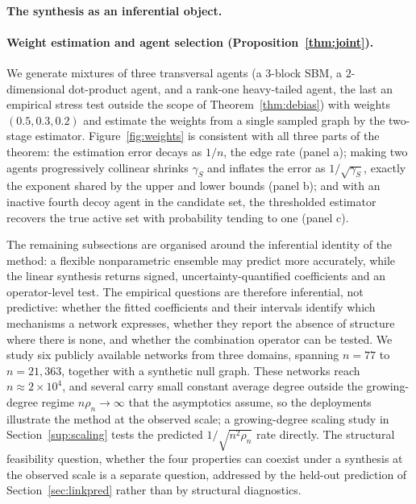 \documentclass[12pt]{article}
\newcommand{\1}{\mathbf{1}}
\begin{document}
\paragraph{The synthesis as an inferential object.}

\paragraph{Weight estimation and agent selection (Proposition~\ref{thm:joint}).}
We generate mixtures of three transversal agents (a $3$-block SBM, a $2$-dimensional dot-product
agent, and a rank-one heavy-tailed agent, the last an empirical stress test outside the scope of
Theorem~\ref{thm:debias}) with weights $(0.5,0.3,0.2)$ and estimate the weights from
a single sampled graph by the two-stage estimator. Figure~\ref{fig:weights} is consistent with all three parts
of the theorem: the estimation error decays as $1/n$, the edge rate (panel a); making two
agents progressively collinear shrinks $\gamma_S$ and inflates the error as $1/\sqrt{\gamma_S}$,
exactly the exponent shared by the upper and lower bounds (panel b); and with an inactive fourth
decoy agent in the candidate set, the thresholded estimator recovers the true active set with probability
tending to one (panel c).

The remaining subsections are organised around the inferential identity of the method: a flexible
nonparametric ensemble may predict more accurately, while the linear synthesis returns signed,
uncertainty-quantified coefficients and an operator-level test. The empirical
questions are therefore inferential, not predictive: whether the fitted coefficients and their
intervals identify which mechanisms a network expresses, whether they report the absence of structure
where there is none, and whether the combination operator can be tested. We study six publicly
available networks from three domains, spanning $n=77$ to $n=21{,}363$, together with a synthetic null graph. These networks reach $n\approx2\times10^4$, and several carry small constant average degree outside the growing-degree regime $n\rho_n\to\infty$ that the asymptotics assume, so the deployments illustrate the method at the observed scale; a growing-degree scaling study in Section~\ref{sup:scaling} tests the predicted $1/\sqrt{n^2\rho_n}$ rate directly. The structural feasibility question, whether the four properties can coexist under a
synthesis at the observed scale is a separate question, addressed by the held-out prediction of
Section~\ref{sec:linkpred} rather than by structural diagnostics.
\end{document}
